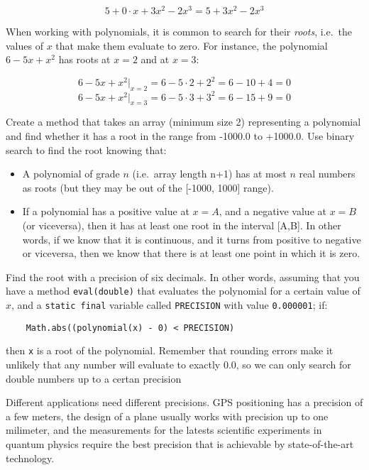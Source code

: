 \documentclass{article}
\begin{document}
$$ 5 + 0 \cdot x + 3 x^2 - 2 x^3 = 5 + 3 x^2 - 2 x^3 $$

When working with polynomials, it is common to search for their
\emph{roots}, i.e.~the values of $x$ that make them evaluate to
zero. For instance, the polynomial $6 - 5 x + x^2$ has roots 
at $x = 2$ and at $x = 3$: 

$$ 6 - 5 x + x^2 |_{x = 2} = 6 - 5 \cdot 2 + 2^2 = 6 - 10 + 4 = 0 $$
$$ 6 - 5 x + x^2 |_{x = 3} = 6 - 5 \cdot 3 + 3^2 = 6 - 15 + 9 = 0 $$

Create a method that takes an array (minimum size 2) representing a
polynomial and find whether it has a root in the range from -1000.0 to
+1000.0. Use binary search to find the root knowing that: 

\begin{itemize}
\item A polynomial of grade $n$ (i.e.~array length n+1) has at most
  $n$ real numbers as roots 
  (but they may be out of the [-1000, 1000] range).
\item If a polynomial has a positive value at $x = A$, and a negative
  value at $x = B$ (or viceversa), then it has at least one root in the
  interval [A,B]. In other words, if we know that it is continuous,
  and it turns from positive to negative or viceversa, then we know
  that there is at
  least one point in which it is zero. 
\end{itemize}

Find the root with a precision of six decimals. In other words,
assuming that you have a method \verb+eval(double)+ that evaluates the
polynomial for a certain value of $x$, and a \verb+static final+
variable called \verb+PRECISION+ with value \verb+0.000001+;  if:

\begin{verbatim}
    Math.abs((polynomial(x) - 0) < PRECISION)
\end{verbatim}

then \verb+x+ is a root of the polynomial. Remember that rounding errors make
it unlikely that any number will evaluate to exactly 0.0, so we can
only search for double numbers up to a certan precision

Different applications need different precisions. GPS positioning has
a precision of a few meters, the design of a
plane usually works with precision up to one milimeter,
and the measurements for the latests scientific experiments in
quantum physics require the best precision that is achievable by
state-of-the-art technology. 
\end{document}

